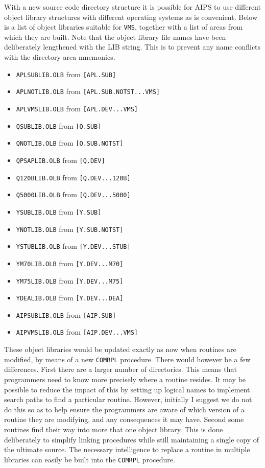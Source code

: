 With a new source code directory structure it is possible for AIPS to
use different object library structures with different operating systems
as is convenient. Below is a list of object libraries suitable for {\tt VMS\/},
together with a list of areas
from which they are built. Note that the object library file names have
been deliberately lengthened with the LIB string. This is to prevent any
name conflicts with the directory area mnemonics.

\begin{itemize}
  \item{{\tt APLSUBLIB.OLB}	from {\tt [APL.SUB]}}
  \item{{\tt APLNOTLIB.OLB}	from {\tt [APL.SUB.NOTST...VMS]}}
  \item{{\tt APLVMSLIB.OLB}	from {\tt [APL.DEV...VMS]}}

  \item{{\tt QSUBLIB.OLB}	from {\tt [Q.SUB]}}
  \item{{\tt QNOTLIB.OLB}	from {\tt [Q.SUB.NOTST]}}
  \item{{\tt QPSAPLIB.OLB}	from {\tt [Q.DEV]}}
  \item{{\tt Q120BLIB.OLB}	from {\tt [Q.DEV...120B]}}
  \item{{\tt Q5000LIB.OLB}	from {\tt [Q.DEV...5000]}}

  \item{{\tt YSUBLIB.OLB}	from {\tt [Y.SUB]}}
  \item{{\tt YNOTLIB.OLB}	from {\tt [Y.SUB.NOTST]}}
  \item{{\tt YSTUBLIB.OLB}	from {\tt [Y.DEV...STUB]}}
  \item{{\tt YM70LIB.OLB}	from {\tt [Y.DEV...M70]}}
  \item{{\tt YM75LIB.OLB}	from {\tt [Y.DEV...M75]}}
  \item{{\tt YDEALIB.OLB}	from {\tt [Y.DEV...DEA]}}

  \item{{\tt AIPSUBLIB.OLB}	from {\tt [AIP.SUB]}}
  \item{{\tt AIPVMSLIB.OLB}	from {\tt [AIP.DEV...VMS]}}
\end{itemize}

These object libraries would be updated exactly as now when routines are
modified, by means of a new {\tt COMRPL} procedure. There would however
be a few differences. First there are a larger number of directories.
This means that programmers need to know more precisely where a routine
resides. It may be possible to reduce the impact of this by setting up
logical names to implement search paths to find a particular routine.
However, initially I suggest we do not do this so as to help ensure the
programmers are aware of which version of a routine they are modifying,
and any consequences it may have. Second some routines find their way
into more that one object library. This is done deliberately to simplify
linking procedures while still maintaining a single copy of the ultimate
source. The necessary intelligence to replace a routine in multiple
libraries can easily be built into the {\tt COMRPL} procedure.

